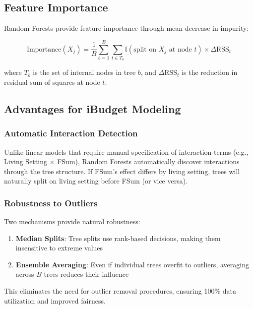 \subsection{Feature Importance}

Random Forests provide feature importance through mean decrease in impurity:

\begin{equation}
\text{Importance}(X_j) = \frac{1}{B} \sum_{b=1}^{B} \sum_{t \in T_b} \mathbb{I}(\text{split on } X_j \text{ at node } t) \times \Delta \text{RSS}_t
\end{equation}

where $T_b$ is the set of internal nodes in tree $b$, and $\Delta \text{RSS}_t$ is the reduction in residual sum of squares at node $t$.

\subsection{Advantages for iBudget Modeling}

\subsubsection{Automatic Interaction Detection}

Unlike linear models that require manual specification of interaction terms (e.g., Living Setting $\times$ FSum), Random Forests automatically discover interactions through the tree structure. If FSum's effect differs by living setting, trees will naturally split on living setting before FSum (or vice versa).

\subsubsection{Robustness to Outliers}

Two mechanisms provide natural robustness:

\begin{enumerate}
    \item \textbf{Median Splits}: Tree splits use rank-based decisions, making them insensitive to extreme values
    \item \textbf{Ensemble Averaging}: Even if individual trees overfit to outliers, averaging across $B$ trees reduces their influence
\end{enumerate}

This eliminates the need for outlier removal procedures, ensuring 100\% data utilization and improved fairness.

